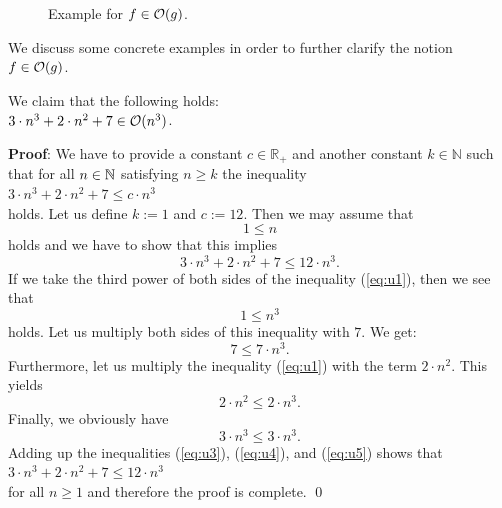 \begin{figure}[!ht]
  \centering
  \caption{Example for $f \in \mathcal{O}(g)$.} 
  \label{fig:big-o.eps}
\end{figure}


\noindent
We discuss some concrete examples in order to further clarify the notion $f \in \mathcal{O}(g)$.

\example
We claim that the following holds:
\\[0.2cm]
\hspace*{1.3cm}
$3 \cdot n^3 + 2 \cdot n^2 + 7 \in \mathcal{O}(n^3)$. 
\ex

\noindent
\textbf{Proof}:  We have to  provide a constant $c\in\mathbb{R}_+$ and another constant $k\in\mathbb{N}$ such that for all $n\in
{\mathbb N}$ satisfying
$n \geq k$ the inequality
\\[0.2cm]
\hspace*{1.3cm} 
$3 \cdot n^3 + 2 \cdot n^2 + 7 \leq c \cdot n^3$
\\[0.2cm]
holds.  Let us define  $k := 1$ and $c := 12$.  Then we may assume that 
\begin{equation}
  \label{eq:u1}
  1\leq n  
\end{equation}
holds and we have to show that this implies 
\begin{equation}
  \label{eq:u2}
  3 \cdot n^3 + 2 \cdot n^2 + 7 \leq 12 \cdot n^3.
\end{equation}
If we take the third power of both sides of the inequality (\ref{eq:u1}), then we see that
\begin{equation}
  \label{eq:u3pre}
  1 \leq n^3
\end{equation}
holds.  Let us multiply both sides of this inequality with $7$.  We get: 
\begin{equation}
  \label{eq:u3}
  7 \leq 7 \cdot n^3.
\end{equation}
Furthermore, let us multiply the inequality (\ref{eq:u1}) with the term $2\cdot n^2$.  This yields
\begin{equation}
  \label{eq:u4}
  2 \cdot n^2 \leq 2 \cdot n^3.
\end{equation}
Finally, we obviously have
\begin{equation}
  \label{eq:u5}
  3 \cdot n^3 \leq 3 \cdot n^3.
\end{equation}
Adding up the inequalities (\ref{eq:u3}), (\ref{eq:u4}), and (\ref{eq:u5}) shows that \\[0.2cm]
\hspace*{1.3cm} $3 \cdot n^3 + 2 \cdot n^2 + 7 \leq 12 \cdot n^3$ \\[0.2cm]
for all $n \geq 1$ and therefore the proof is complete. \qed

